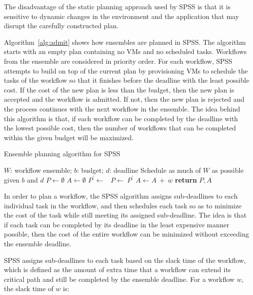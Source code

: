\documentclass{sig-alternate}
\begin{document}
The disadvantage of the static planning approach used by SPSS is that it is 
sensitive to dynamic changes in the environment and the application that may 
disrupt the carefully constructed plan.

Algorithm~\ref{alg:admit} shows how ensembles are planned in SPSS. The algorithm
starts with an empty plan containing no VMs and no scheduled tasks. Workflows
from the ensemble are considered in priority order. For each workflow, SPSS
attempts to build on top of the current plan by provisioning VMs to schedule 
the tasks of the workflow so that it finishes before the deadline with the least
possible cost. If the cost of the new plan is less than the budget, then the 
new plan is accepted and the workflow is admitted. If not, then the new plan is 
rejected and the process continues with the next workflow in the ensemble. The 
idea behind this algorithm is that, if each workflow can be completed by the 
deadline with the lowest possible cost, then the number of workflows that can 
be completed within the given budget will be maximized.

\begin{algorithm}
\caption{Ensemble planning algorithm for SPSS}
\label{alg:admit}
\begin{algorithmic}[1]
\Require $W$: workflow ensemble; $b$: budget; $d$: deadline
\Ensure Schedule as much of $W$ as possible given $b$ and $d$
    \State $P\gets \emptyset$ 
    \State $A\gets \emptyset$ 
        \State $P^\prime \gets$\ 
            \State $P\gets\ P^\prime$ 
            \State $A \gets A\ +\ w$ 
        \EndIf
    \EndFor
    \State \textbf{return} $P,A$
\EndProcedure
\end{algorithmic}
\end{algorithm}

In order to plan a workflow, the SPSS algorithm assigns 
sub-deadlines to each individual task in the workflow, and then schedules 
each task so as to minimize the cost of the task while still meeting its 
assigned sub-deadline. The idea is that if each task can be completed by 
its deadline in the least expensive manner possible, then the cost of the
entire workflow can be minimized without exceeding the ensemble deadline.

SPSS assigns sub-deadlines to each task based on the slack time of the
workflow, which is defined as the amount of extra time that a workflow
can extend its critical path and still be completed by the ensemble deadline.
For a workflow $w$, the slack time of $w$ is:
\end{document}
